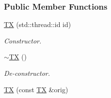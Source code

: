 \subsubsection*{Public Member Functions}
\begin{DoxyCompactItemize}
\item 
\hyperlink{class_t_x_a8a4b83eab0171ae834bfa92bbced1094}{TX} (std\+::thread\+::id id)
\begin{DoxyCompactList}\small\item\em Constructor. \end{DoxyCompactList}\item 
\hyperlink{class_t_x_abecf854cc3228ab6dd51175b3cd1c70a}{$\sim$\+TX} ()\hypertarget{class_t_x_abecf854cc3228ab6dd51175b3cd1c70a}{}\label{class_t_x_abecf854cc3228ab6dd51175b3cd1c70a}

\begin{DoxyCompactList}\small\item\em De-\/constructor. \end{DoxyCompactList}\item 
\hyperlink{class_t_x_ab96b3dd2bfd621b47307f0af3ec4f35c}{TX} (const \hyperlink{class_t_x}{TX} \&orig)\hypertarget{class_t_x_ab96b3dd2bfd621b47307f0af3ec4f35c}{}\label{class_t_x_ab96b3dd2bfd621b47307f0af3ec4f35c}


\end{DoxyCompactItemize}
